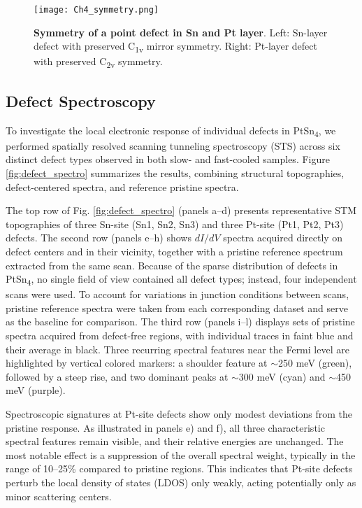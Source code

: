 \begin{figure}
	\centering
	\texttt{[image: Ch4\_symmetry.png]}
	\caption[\textbf{Symmetry of a point defect on Sn and Pt layer}]{\textbf{Symmetry of a point defect in Sn and Pt layer}. Left: Sn-layer defect with preserved C\textsubscript{1v} mirror symmetry. Right: Pt-layer defect with preserved C\textsubscript{2v} symmetry.}
	\label{fig:ch4_symmetry}
\end{figure}


\subsection{Defect Spectroscopy}\label{section:defect_spectro}
To investigate the local electronic response of individual defects in PtSn\textsubscript{4}, we performed spatially resolved scanning tunneling spectroscopy (STS) across six distinct defect types observed in both slow- and fast-cooled samples. Figure \ref{fig:defect_spectro} summarizes the results, combining structural topographies, defect-centered spectra, and reference pristine spectra.

The top row of Fig. \ref{fig:defect_spectro} (panels a–d) presents representative STM topographies of three Sn-site (Sn1, Sn2, Sn3) and three Pt-site (Pt1, Pt2, Pt3) defects. The second row (panels e–h) shows $dI/dV$ spectra acquired directly on defect centers and in their vicinity, together with a pristine reference spectrum extracted from the same scan. Because of the sparse distribution of defects in PtSn\textsubscript{4}, no single field of view contained all defect types; instead, four independent scans were used. To account for variations in junction conditions between scans, pristine reference spectra were taken from each corresponding dataset and serve as the baseline for comparison. The third row (panels i–l) displays sets of pristine spectra acquired from defect-free regions, with individual traces in faint blue and their average in black. Three recurring spectral features near the Fermi level are highlighted by vertical colored markers: a shoulder feature at $\sim$250 meV (green), followed by a steep rise, and two dominant peaks at $\sim$300 meV (cyan) and $\sim$450 meV (purple).

Spectroscopic signatures at Pt-site defects show only modest deviations from the pristine response. As illustrated in panels e) and f), all three characteristic spectral features remain visible, and their relative energies are unchanged. The most notable effect is a suppression of the overall spectral weight, typically in the range of 10–25\% compared to pristine regions. This indicates that Pt-site defects perturb the local density of states (LDOS) only weakly, acting potentially only as minor scattering centers.

